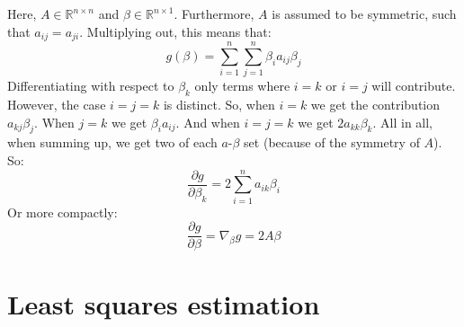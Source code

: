 \documentclass[12pt, a4paper]{article}
\begin{document}
Here, $A\in\mathbb{R}^{n\times n}$ and $\beta\in\mathbb{R}^{n\times 1}$. Furthermore, $A$ is assumed to be symmetric, such that $a_{ij}=a_{ji}$. Multiplying out, this means that:
\begin{equation}
g(\beta)=\sum_{i=1}^n\sum_{j=1}^n\beta_i a_{ij}\beta_j
\end{equation}
Differentiating with respect to $\beta_k$ only terms where $i=k$ or $i=j$ will contribute. However, the case $i=j=k$ is distinct. So, when $i=k$ we get the contribution $a_{kj}\beta_j$. When $j=k$ we get $\beta_i a_{ij}$. And when $i=j=k$ we get $2a_{kk}\beta_k$. All in all, when summing up, we get two of each $a$-$\beta$ set (because of the symmetry of $A$). So:
\begin{equation}
\frac{\partial g}{\partial\beta_k}=2\sum_{i=1}^n a_{ik}\beta_i
\end{equation}
Or more compactly:
\begin{equation}
\label{quadformdif}
\frac{\partial g}{\partial \beta}=\nabla_\beta g=2A\beta
\end{equation}

\section{Least squares estimation}
\end{document}

